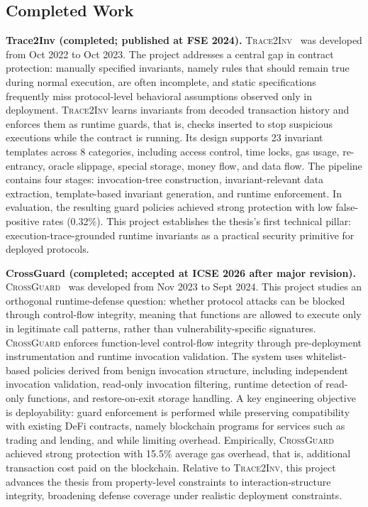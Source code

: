 \subsection{Completed Work}

\noindent \textbf{Trace2Inv (completed; published at FSE 2024).}
\textsc{Trace2Inv}~\cite{chen2024demystifying} was developed from Oct 2022 to Oct 2023.
The project addresses a central gap in contract protection: manually specified invariants, namely rules that should remain true during normal execution, are often incomplete,
and static specifications frequently miss protocol-level behavioral assumptions observed only in deployment.
\textsc{Trace2Inv} learns invariants from decoded transaction history and enforces them as runtime guards, that is, checks inserted to stop suspicious executions while the contract is running.
Its design supports 23 invariant templates across 8 categories, including access control, time locks,
gas usage, re-entrancy, oracle slippage, special storage, money flow, and data flow.
The pipeline contains four stages: invocation-tree construction, invariant-relevant data extraction,
template-based invariant generation, and runtime enforcement.
In evaluation, the resulting guard policies achieved strong protection with low false-positive rates (0.32\%).
This project establishes the thesis's first technical pillar: execution-trace-grounded runtime invariants
as a practical security primitive for deployed protocols.

\noindent \textbf{CrossGuard (completed; accepted at ICSE 2026 after major revision).}
\textsc{CrossGuard}~\cite{chen2025secure} was developed from Nov 2023 to Sept 2024.
This project studies an orthogonal runtime-defense question: whether protocol attacks can be blocked
through control-flow integrity, meaning that functions are allowed to execute only in legitimate call patterns, rather than vulnerability-specific signatures.
\textsc{CrossGuard} enforces function-level control-flow integrity through pre-deployment instrumentation
and runtime invocation validation.
The system uses whitelist-based policies derived from benign invocation structure,
including independent invocation validation, read-only invocation filtering,
runtime detection of read-only functions, and restore-on-exit storage handling.
A key engineering objective is deployability: guard enforcement is performed while preserving compatibility
with existing DeFi contracts, namely blockchain programs for services such as trading and lending, and while limiting overhead.
Empirically, \textsc{CrossGuard} achieved strong protection with 15.5\% average gas overhead, that is, additional transaction cost paid on the blockchain.
Relative to \textsc{Trace2Inv}, this project advances the thesis from property-level constraints
to interaction-structure integrity, broadening defense coverage under realistic deployment constraints.

